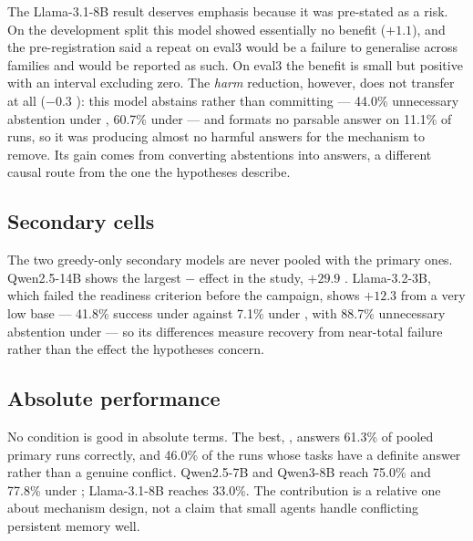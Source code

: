 The Llama-3.1-8B result deserves emphasis because it was pre-stated as a risk. On the development split this model
showed essentially no benefit ($+1.1$\pp), and the pre-registration said a repeat on eval3 would be a failure to
generalise across families and would be reported as such. On eval3 the benefit is small but positive with an
interval excluding zero. The \emph{harm} reduction, however, does not transfer at all ($-0.3$\pp{}
): this model abstains rather than committing --- 44.0\% unnecessary abstention under ,
60.7\% under  --- and formats no parsable answer on 11.1\% of runs, so it was producing almost no harmful
answers for the mechanism to remove. Its gain comes from converting abstentions into answers, a different causal
route from the one the hypotheses describe.

\subsection{Secondary cells}

The two greedy-only secondary models are never pooled with the primary ones. Qwen2.5-14B shows the largest
 $-$  effect in the study, $+29.9$\pp{} . Llama-3.2-3B, which failed the
readiness criterion before the campaign, shows $+12.3$\pp{}  from a very low base --- 41.8\% success
under  against 7.1\% under , with 88.7\% unnecessary abstention under  --- so its
differences measure recovery from near-total failure rather than the effect the hypotheses concern.

\subsection{Absolute performance}

No condition is good in absolute terms. The best, , answers 61.3\% of pooled primary runs correctly, and
46.0\% of the runs whose tasks have a definite answer rather than a genuine conflict. Qwen2.5-7B and Qwen3-8B reach
75.0\% and 77.8\% under ; Llama-3.1-8B reaches 33.0\%. The contribution is a relative one about
mechanism design, not a claim that small agents handle conflicting persistent memory well.
